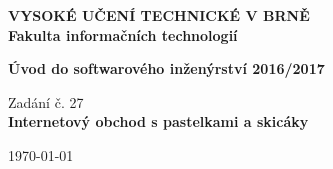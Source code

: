 \begin{titlepage}
	\centering

	{\fontsize{20pt}{15pt}\bfseries 
		VYSOKÉ UČENÍ TECHNICKÉ V BRNĚ\\
		\vspace{8pt}
		Fakulta informačních technologií
	}

	\begin{figure}[H]
		\centering
		\vspace{-30pt}
		
	\end{figure}

	\vfill

	{\Large \bfseries Úvod do softwarového inženýrství 2016/2017\\}
	\vspace*{2pt}
	{\Large \thetitle}

	\vspace*{32pt}

	{\Large Zadání č. 27\\}
	\vspace*{8pt}
	{\fontsize{16pt}{15pt}\bfseries Internetový obchod s pastelkami a skicáky}

	\vfill

	{\Large \today \hfill \theauthor}
\end{titlepage}